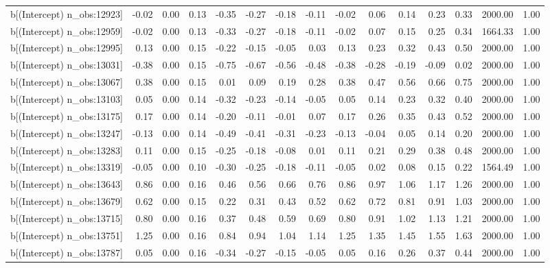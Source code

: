 \begin{table}[ht]
\begin{tabular}{rrrrrrrrrrrrrrr}
  b[(Intercept) n\_obs:12923] & -0.02 & 0.00 & 0.13 & -0.35 & -0.27 & -0.18 & -0.11 & -0.02 & 0.06 & 0.14 & 0.23 & 0.33 & 2000.00 & 1.00 \\ 
  b[(Intercept) n\_obs:12959] & -0.02 & 0.00 & 0.13 & -0.33 & -0.27 & -0.18 & -0.11 & -0.02 & 0.07 & 0.15 & 0.25 & 0.34 & 1664.33 & 1.00 \\ 
  b[(Intercept) n\_obs:12995] & 0.13 & 0.00 & 0.15 & -0.22 & -0.15 & -0.05 & 0.03 & 0.13 & 0.23 & 0.32 & 0.43 & 0.50 & 2000.00 & 1.00 \\ 
  b[(Intercept) n\_obs:13031] & -0.38 & 0.00 & 0.15 & -0.75 & -0.67 & -0.56 & -0.48 & -0.38 & -0.28 & -0.19 & -0.09 & 0.02 & 2000.00 & 1.00 \\ 
  b[(Intercept) n\_obs:13067] & 0.38 & 0.00 & 0.15 & 0.01 & 0.09 & 0.19 & 0.28 & 0.38 & 0.47 & 0.56 & 0.66 & 0.75 & 2000.00 & 1.00 \\ 
  b[(Intercept) n\_obs:13103] & 0.05 & 0.00 & 0.14 & -0.32 & -0.23 & -0.14 & -0.05 & 0.05 & 0.14 & 0.23 & 0.32 & 0.40 & 2000.00 & 1.00 \\ 
  b[(Intercept) n\_obs:13175] & 0.17 & 0.00 & 0.14 & -0.20 & -0.11 & -0.01 & 0.07 & 0.17 & 0.26 & 0.35 & 0.43 & 0.52 & 2000.00 & 1.00 \\ 
  b[(Intercept) n\_obs:13247] & -0.13 & 0.00 & 0.14 & -0.49 & -0.41 & -0.31 & -0.23 & -0.13 & -0.04 & 0.05 & 0.14 & 0.20 & 2000.00 & 1.00 \\ 
  b[(Intercept) n\_obs:13283] & 0.11 & 0.00 & 0.15 & -0.25 & -0.18 & -0.08 & 0.01 & 0.11 & 0.21 & 0.29 & 0.38 & 0.48 & 2000.00 & 1.00 \\ 
  b[(Intercept) n\_obs:13319] & -0.05 & 0.00 & 0.10 & -0.30 & -0.25 & -0.18 & -0.11 & -0.05 & 0.02 & 0.08 & 0.15 & 0.22 & 1564.49 & 1.00 \\ 
  b[(Intercept) n\_obs:13643] & 0.86 & 0.00 & 0.16 & 0.46 & 0.56 & 0.66 & 0.76 & 0.86 & 0.97 & 1.06 & 1.17 & 1.26 & 2000.00 & 1.00 \\ 
  b[(Intercept) n\_obs:13679] & 0.62 & 0.00 & 0.15 & 0.22 & 0.31 & 0.43 & 0.52 & 0.62 & 0.72 & 0.81 & 0.91 & 1.03 & 2000.00 & 1.00 \\ 
  b[(Intercept) n\_obs:13715] & 0.80 & 0.00 & 0.16 & 0.37 & 0.48 & 0.59 & 0.69 & 0.80 & 0.91 & 1.02 & 1.13 & 1.21 & 2000.00 & 1.00 \\ 
  b[(Intercept) n\_obs:13751] & 1.25 & 0.00 & 0.16 & 0.84 & 0.94 & 1.04 & 1.14 & 1.25 & 1.35 & 1.45 & 1.55 & 1.63 & 2000.00 & 1.00 \\ 
  b[(Intercept) n\_obs:13787] & 0.05 & 0.00 & 0.16 & -0.34 & -0.27 & -0.15 & -0.05 & 0.05 & 0.16 & 0.26 & 0.37 & 0.44 & 2000.00 & 1.00 \\ 

\end{tabular}
\end{table}
